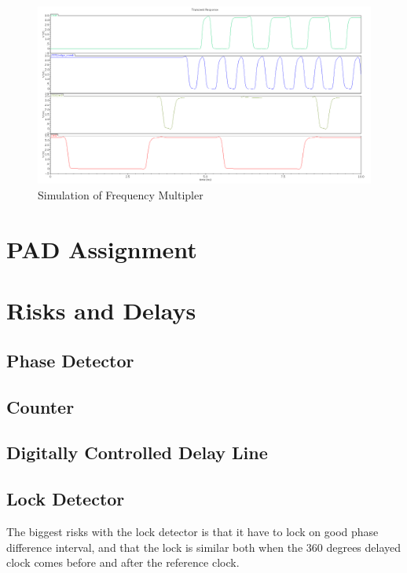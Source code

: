 \documentclass[a4paper,12pt]{article} \usepackage{graphicx}
\begin{document}
\begin{figure}[p]
        \centering
        \includegraphics[width=\textwidth]{../Bilder/freq_mult_signals.png}
        \caption{Simulation of Frequency Multipler}
        \label{fig:freq_mult_signals}
\end{figure}

\section{PAD Assignment} %
\section{Risks and Delays}
\subsection{Phase Detector}
\subsection{Counter}
\subsection{Digitally Controlled Delay Line}
\subsection{Lock Detector}
The biggest risks with the lock detector is that it have to lock on
good phase difference interval, and that the lock is similar both when
the 360 degrees delayed clock comes before and after the reference
clock. 
\end{document}
